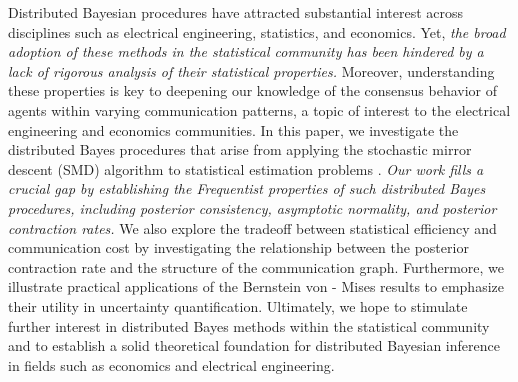 \documentclass[twoside,11pt]{article}
\numberwithin{equation}{section}
\begin{document}
Distributed Bayesian procedures have attracted substantial interest across disciplines such as electrical engineering, statistics, and economics. Yet, \textit{the broad adoption of these methods in the statistical community has been hindered by a lack of rigorous analysis of their statistical properties.} Moreover, understanding these properties is key to deepening our knowledge of the consensus behavior of agents within varying communication patterns, a topic of interest to the electrical engineering and economics communities. In this paper, we investigate the distributed Bayes procedures that arise from applying the stochastic mirror descent (SMD) algorithm to statistical estimation problems \citep{Uribe2022-1, Uribe2022-2}. \textit{Our work fills a crucial gap by establishing the Frequentist properties of such distributed Bayes procedures, including posterior consistency, asymptotic normality, and posterior contraction rates.} We also explore the tradeoff between statistical efficiency and communication cost by investigating the relationship between the posterior contraction rate and the structure of the communication graph. Furthermore, we illustrate practical applications of the Bernstein von - Mises results to emphasize their utility in uncertainty quantification. Ultimately, we hope to stimulate further interest in distributed Bayes methods within the statistical community and to establish a solid theoretical foundation for distributed Bayesian inference in fields such as economics and electrical engineering.
\end{document}
